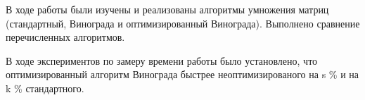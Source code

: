 \Conclusion
    В ходе работы были изучены и реализованы алгоритмы умножения матриц
    (стандартный, Винограда и оптимизированный Винограда).
    Выполнено сравнение перечисленных алгоритмов. 
    
    В ходе экспериментов по замеру времени работы было установлено, что 
    оптимизированный алгоритм Винограда быстрее неоптимизированого на s \% и
    на k \% стандартного.
